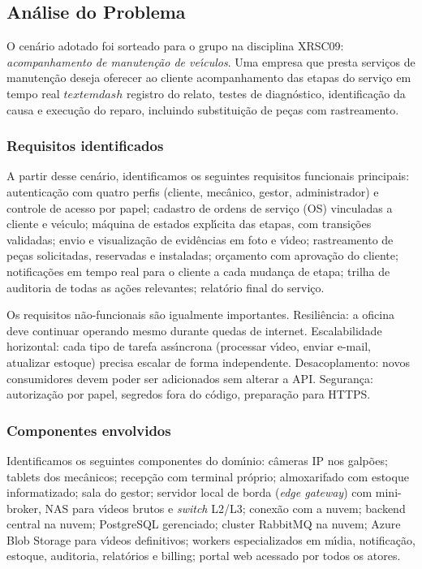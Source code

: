 \documentclass[10pt,a4paper]{article}
\begin{document}
\subsection{An\'alise do Problema}
\label{sec:analise}

O cen\'ario adotado foi sorteado para o grupo na disciplina XRSC09: \emph{acompanhamento de manuten\c{c}\~ao de ve\'\i culos}. Uma empresa que presta servi\c{c}os de manuten\c{c}\~ao deseja oferecer ao cliente acompanhamento das etapas do servi\c{c}o em tempo real \(textemdash\) registro do relato, testes de diagn\'ostico, identifica\c{c}\~ao da causa e execu\c{c}\~ao do reparo, incluindo substitui\c{c}\~ao de pe\c{c}as com rastreamento.

\subsubsection*{Requisitos identificados}

A partir desse cen\'ario, identificamos os seguintes requisitos funcionais principais: autentica\c{c}\~ao com quatro perfis (cliente, mec\^anico, gestor, administrador) e controle de acesso por papel; cadastro de ordens de servi\c{c}o (OS) vinculadas a cliente e ve\'\i culo; m\'aquina de estados expl\'\i cita das etapas, com transi\c{c}\~oes validadas; envio e visualiza\c{c}\~ao de evid\^encias em foto e v\'\i deo; rastreamento de pe\c{c}as solicitadas, reservadas e instaladas; or\c{c}amento com aprova\c{c}\~ao do cliente; notifica\c{c}\~oes em tempo real para o cliente a cada mudan\c{c}a de etapa; trilha de auditoria de todas as a\c{c}\~oes relevantes; relat\'orio final do servi\c{c}o.

Os requisitos n\~ao-funcionais s\~ao igualmente importantes. Resili\^encia: a oficina deve continuar operando mesmo durante quedas de internet. Escalabilidade horizontal: cada tipo de tarefa ass\'\i ncrona (processar v\'\i deo, enviar e-mail, atualizar estoque) precisa escalar de forma independente. Desacoplamento: novos consumidores devem poder ser adicionados sem alterar a API. Seguran\c{c}a: autoriza\c{c}\~ao por papel, segredos fora do c\'odigo, prepara\c{c}\~ao para HTTPS.

\subsubsection*{Componentes envolvidos}

Identificamos os seguintes componentes do dom\'\i nio: c\^ameras IP nos galp\~oes; tablets dos mec\^anicos; recep\c{c}\~ao com terminal pr\'oprio; almoxarifado com estoque informatizado; sala do gestor; servidor local de borda (\emph{edge gateway}) com mini-broker, NAS para v\'\i deos brutos e \emph{switch} L2/L3; conex\~ao com a nuvem; backend central na nuvem; PostgreSQL gerenciado; cluster RabbitMQ na nuvem; Azure Blob Storage para v\'\i deos definitivos; workers especializados em m\'\i dia, notifica\c{c}\~ao, estoque, auditoria, relat\'orios e billing; portal web acessado por todos os atores.
\end{document}
